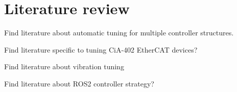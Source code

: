 \section{Literature review}

Find literature about automatic tuning for multiple controller structures. 

Find literature specific to tuning CiA-402 EtherCAT devices? 

Find literature about vibration tuning

Find literature about ROS2 controller strategy?
